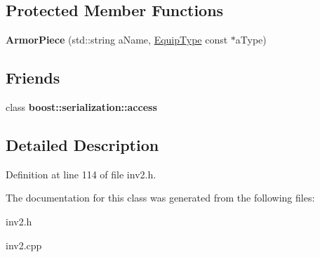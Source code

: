 \subsection*{Protected Member Functions}
\begin{DoxyCompactItemize}
\item 
\hypertarget{class_armor_piece_a7149ebcb6c3cc80666f122981fe460c5}{}\label{class_armor_piece_a7149ebcb6c3cc80666f122981fe460c5} 
{\bfseries Armor\+Piece} (std\+::string a\+Name, \hyperlink{class_equip_type}{Equip\+Type} const $\ast$a\+Type)
\end{DoxyCompactItemize}
\subsection*{Friends}
\begin{DoxyCompactItemize}
\item 
\hypertarget{class_armor_piece_ac98d07dd8f7b70e16ccb9a01abf56b9c}{}\label{class_armor_piece_ac98d07dd8f7b70e16ccb9a01abf56b9c} 
class {\bfseries boost\+::serialization\+::access}
\end{DoxyCompactItemize}


\subsection{Detailed Description}


Definition at line 114 of file inv2.\+h.



The documentation for this class was generated from the following files\+:\begin{DoxyCompactItemize}
\item 
inv2.\+h\item 
inv2.\+cpp\end{DoxyCompactItemize}
